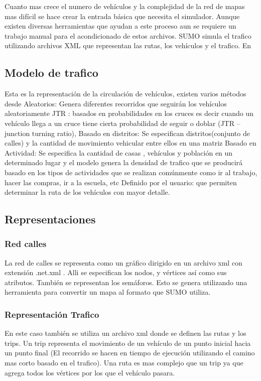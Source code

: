 Cuanto mas crece el numero de vehículos y la complejidad de la red de mapas mas difícil se hace crear la entrada básica que necesita el simulador. Aunque existen diversas herramientas que ayudan a este proceso aun se requiere un trabajo manual para el acondicionado de estos archivos.
SUMO simula el trafico utilizando archivos XML que representan las rutas, los vehículos y el trafico. En 

\subsection{Modelo de trafico }
Esta es la representación de la circulación de vehículos, existen varios métodos desde 
Aleatorios: Genera diferentes recorridos que seguirán los vehículos aleatoriamente
JTR : basados en probabilidades en los cruces  es decir cuando un vehículo llega a un cruce tiene cierta probabilidad de seguir o doblar (JTR – junction turning ratio), 
Basado en distritos:  Se especifican distritos(conjunto de calles) y  la cantidad de movimiento vehicular entre ellos en una  matriz
Basado en Actividad: Se especifica la cantidad de casas , vehículos y población en un determinado lugar y el modelo genera la densidad de trafico que se producirá basado en los tipos de actividades que se realizan comúnmente como ir al trabajo, hacer las compras, ir a la escuela,  etc
Definido por el usuario: que permiten determinar la ruta de los vehículos con mayor detalle.

\subsection{Representaciones}

\subsubsection{Red calles}
La red de calles se representa como un gráfico dirigido en un archivo xml con extensión .net.xml . Alli se especifican los nodos, y vértices así como sus atributos. También se representan los semáforos. Esto  se genera utilizando una herramienta  para convertir un mapa al formato que SUMO utiliza.

\subsubsection{Representación Trafico}
En este caso también se utiliza un archivo xml donde se definen las rutas y los trips. Un trip representa el movimiento de un vehículo de un punto inicial hacia un punto final (El recorrido se hacen en tiempo de ejecución utilizando el camino mas corto basado en el trafico). Una ruta es mas complejo que un trip ya que agrega todos los vértices por los que el vehículo pasara.

